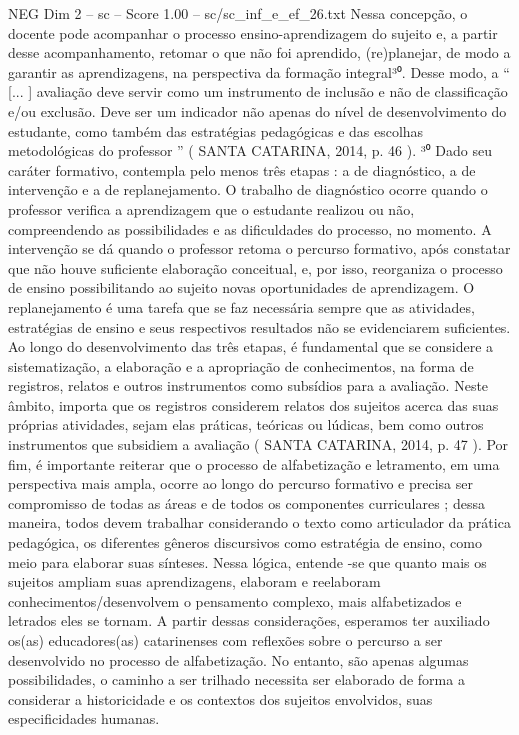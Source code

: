 \begin{textsample}{NEG Dim 2 – sc – Score 1.00 – sc/sc\_inf\_e\_ef\_26.txt}
Nessa concepção, o docente pode acompanhar o processo ensino-aprendizagem do sujeito e, a partir desse acompanhamento, retomar o que não foi aprendido, (re)planejar, de modo a garantir as aprendizagens, na perspectiva da formação integral³⁰.
Desse modo, a “ [... ] avaliação deve servir como um instrumento de inclusão e não de classificação e/ou exclusão.
Deve ser um indicador não apenas do nível de desenvolvimento do estudante, como também das estratégias pedagógicas e das escolhas metodológicas do professor ” ( SANTA CATARINA, 2014, p. 46 ). ³⁰ Dado seu caráter formativo, contempla pelo menos três etapas : a de diagnóstico, a de intervenção e a de replanejamento.
O trabalho de diagnóstico ocorre quando o professor verifica a aprendizagem que o estudante realizou ou não, compreendendo as possibilidades e as dificuldades do processo, no momento.
A intervenção se dá quando o professor retoma o percurso formativo, após constatar que não houve suficiente elaboração conceitual, e, por isso, reorganiza o processo de ensino possibilitando ao sujeito novas oportunidades de aprendizagem.
O replanejamento é uma tarefa que se faz necessária sempre que as atividades, estratégias de ensino e seus respectivos resultados não se evidenciarem suficientes.
Ao longo do desenvolvimento das três etapas, é fundamental que se considere a sistematização, a elaboração e a apropriação de conhecimentos, na forma de registros, relatos e outros instrumentos como subsídios para a avaliação.
Neste âmbito, importa que os registros considerem relatos dos sujeitos acerca das suas próprias atividades, sejam elas práticas, teóricas ou lúdicas, bem como outros instrumentos que subsidiem a avaliação ( SANTA CATARINA, 2014, p. 47 ).
Por fim, é importante reiterar que o processo de alfabetização e letramento, em uma perspectiva mais ampla, ocorre ao longo do percurso formativo e precisa ser compromisso de todas as áreas e de todos os componentes curriculares ; dessa maneira, todos devem trabalhar considerando o texto como articulador da prática pedagógica, os diferentes gêneros discursivos como estratégia de ensino, como meio para elaborar suas sínteses.
Nessa lógica, entende -se que quanto mais os sujeitos ampliam suas aprendizagens, elaboram e reelaboram conhecimentos/desenvolvem o pensamento complexo, mais alfabetizados e letrados eles se tornam.
A partir dessas considerações, esperamos ter auxiliado os(as) educadores(as) catarinenses com reflexões sobre o percurso a ser desenvolvido no processo de alfabetização.
No entanto, são apenas algumas possibilidades, o caminho a ser trilhado necessita ser elaborado de forma a considerar a historicidade e os contextos dos sujeitos envolvidos, suas especificidades humanas.

\end{textsample}
